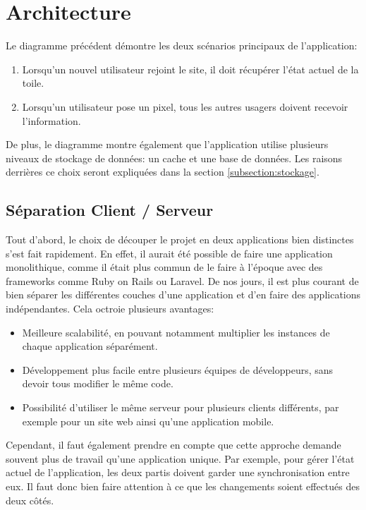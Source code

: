 \section{Architecture}


Le diagramme précédent démontre les deux scénarios principaux de l'application:

\begin{enumerate}
  \item Lorsqu'un nouvel utilisateur rejoint le site, il doit récupérer l'état actuel de la toile.
  \item Lorsqu'un utilisateur pose un pixel, tous les autres usagers doivent recevoir l'information.
\end{enumerate}

De plus, le diagramme montre également que l'application utilise plusieurs niveaux de stockage de données: un cache et une base de données. Les raisons derrières ce choix seront expliquées dans la section \ref{subsection:stockage}.

\subsection{Séparation Client / Serveur}

Tout d'abord, le choix de découper le projet en deux applications bien distinctes s'est fait rapidement. En effet, il aurait été possible de faire une application monolithique, comme il était plus commun de le faire à l'époque avec des frameworks comme Ruby on Rails ou Laravel. De nos jours, il est plus courant de bien séparer les différentes couches d'une application et d'en faire des applications indépendantes. Cela octroie plusieurs avantages:

\begin{itemize}
  \item Meilleure scalabilité, en pouvant notamment multiplier les instances de chaque application séparément.
  \item Développement plus facile entre plusieurs équipes de développeurs, sans devoir tous modifier le même code.
  \item Possibilité d'utiliser le même serveur pour plusieurs clients différents, par exemple pour un site web ainsi qu'une application mobile.
\end{itemize}

Cependant, il faut également prendre en compte que cette approche demande souvent plus de travail qu'une application unique. Par exemple, pour gérer l'état actuel de l'application, les deux partis doivent garder une synchronisation entre eux. Il faut donc bien faire attention à ce que les changements soient effectués des deux côtés.

